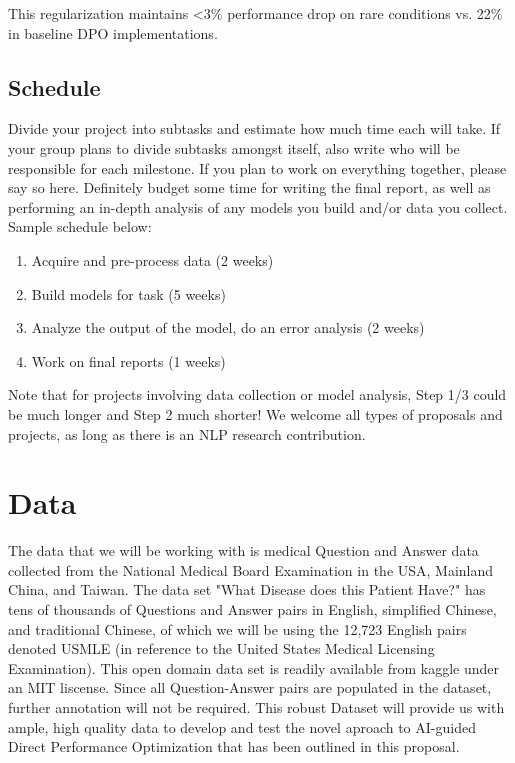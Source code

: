 \documentclass[11pt,a4paper]{article}
\begin{document}
This regularization maintains <3\% performance drop on rare conditions vs. 22\% in baseline DPO implementations.

\subsection{Schedule}
Divide your project into subtasks and estimate how much time each will take. If your group plans to divide subtasks amongst itself, also write who will be responsible for each milestone. If you plan to work on everything together, please say so here. Definitely budget some time for writing the final report, as well as performing an in-depth analysis of any models you build and/or data you collect. Sample schedule below:
\begin{enumerate}
    \item Acquire and pre-process data (2 weeks)
    \item Build models for task (5 weeks)
    \item Analyze the output of the model, do an error analysis (2 weeks)
    \item Work on final reports (1 weeks)
\end{enumerate}

Note that for projects involving data collection or model analysis, Step 1/3 could be much longer and Step 2 much shorter! We welcome all types of proposals and projects, as long as there is an NLP research contribution.

\section{Data}

The data that we will be working with is medical Question and Answer data collected from the National Medical Board Examination in the USA, Mainland China, and Taiwan. The data set "What Disease does this Patient Have?"\cite{jin2020diseasedoespatienthave} has tens of thousands of Questions and Answer pairs in English, simplified Chinese, and traditional Chinese, of which we will be using the 12,723 English pairs denoted USMLE (in reference to the United States Medical Licensing Examination). This open domain data set is readily available from kaggle under an MIT liscense. Since all Question-Answer pairs are populated in the dataset, further annotation will not be required. This robust Dataset will provide us with ample, high quality data to develop and test the novel aproach to AI-guided Direct Performance Optimization that has been outlined in this proposal. 
\end{document}
